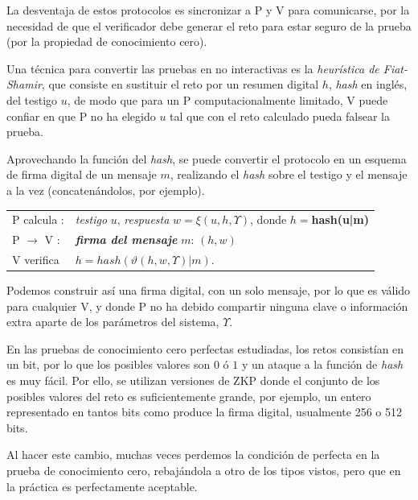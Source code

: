 \hfil

La desventaja de estos protocolos es sincronizar a P y V para comunicarse, por la necesidad de que el verificador debe generar el reto para estar seguro de la prueba (por la propiedad de conocimiento cero).

Una técnica para convertir las pruebas en no interactivas es la \textit{heurística de Fiat-Shamir}, que consiste en sustituir el reto por un resumen digital $h$, \textit{hash} en inglés, del testigo $u$, de modo que para un P computacionalmente limitado, V puede confiar en que P no ha elegido $u$ tal que con el reto calculado pueda falsear la prueba.

Aprovechando la función del \textit{hash}, se puede convertir el protocolo en un esquema de firma digital de un mensaje $m$, realizando el \textit{hash} sobre el testigo y el mensaje a la vez (concatenándolos, por ejemplo).


\begin{center}
	\begin{tabular}{ll}\label{fiat-shamir-heur}
		P calcula :& \textit{testigo} $u$, \textit{respuesta} $w = \xi(u, h,\Upsilon)$, donde $h=$\textbf{hash(u|m)}
		\\
		P $\rightarrow$ V :& \textit{\textbf{firma del mensaje}} $m$: \quad $(h,w)$
		\\
		V verifica & $h=hash(\vartheta(h,w,\Upsilon)|m)$.
	\end{tabular}
\end{center}

Podemos construir así una firma digital, con un solo mensaje, por lo que es válido para cualquier V, y donde P no ha debido compartir ninguna clave o información extra aparte de los parámetros del sistema, $\Upsilon$.

\hfil


\begin{remark}
	\hfil
	
	En las pruebas de conocimiento cero perfectas estudiadas, los retos consistían en un bit, por lo que los posibles valores son $0$ ó $1$ y un ataque a la función de \textit{hash} es muy fácil. Por ello, se utilizan versiones de ZKP donde el conjunto de los posibles valores del reto es suficientemente grande, por ejemplo, un entero representado en tantos bits como produce la firma digital, usualmente 256 o 512 bits.
	
	Al hacer este cambio, muchas veces perdemos la condición de perfecta en la prueba de conocimiento cero, rebajándola a otro de los tipos vistos, pero que en la práctica es perfectamente aceptable.
	
\end{remark}








